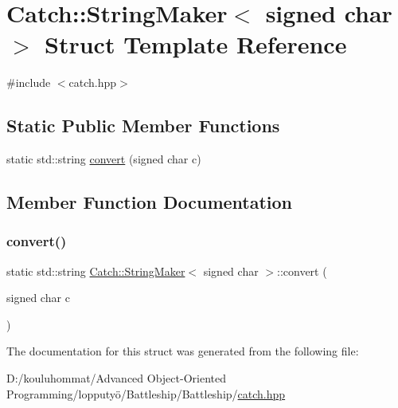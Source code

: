\hypertarget{struct_catch_1_1_string_maker_3_01signed_01char_01_4}{}\section{Catch\+:\+:String\+Maker$<$ signed char $>$ Struct Template Reference}
\label{struct_catch_1_1_string_maker_3_01signed_01char_01_4}


{\ttfamily \#include $<$catch.\+hpp$>$}

\subsection*{Static Public Member Functions}
\begin{DoxyCompactItemize}
\item 
static std\+::string \mbox{\hyperlink{struct_catch_1_1_string_maker_3_01signed_01char_01_4_a5ec41f32916539dc90130539db8222cf}{convert}} (signed char c)
\end{DoxyCompactItemize}


\subsection{Member Function Documentation}
\mbox{\label{struct_catch_1_1_string_maker_3_01signed_01char_01_4_a5ec41f32916539dc90130539db8222cf}} 
\subsubsection{\texorpdfstring{convert()}{convert()}}
{\footnotesize\ttfamily static std\+::string \mbox{\hyperlink{struct_catch_1_1_string_maker}{Catch\+::\+String\+Maker}}$<$ signed char $>$\+::convert (\begin{DoxyParamCaption}\item[{signed char}]{c }\end{DoxyParamCaption})\hspace{0.3cm}{\ttfamily [static]}}



The documentation for this struct was generated from the following file\+:\begin{DoxyCompactItemize}
\item 
D\+:/kouluhommat/\+Advanced Object-\/\+Oriented Programming/lopputyö/\+Battleship/\+Battleship/\mbox{\hyperlink{catch_8hpp}{catch.\+hpp}}\end{DoxyCompactItemize}
